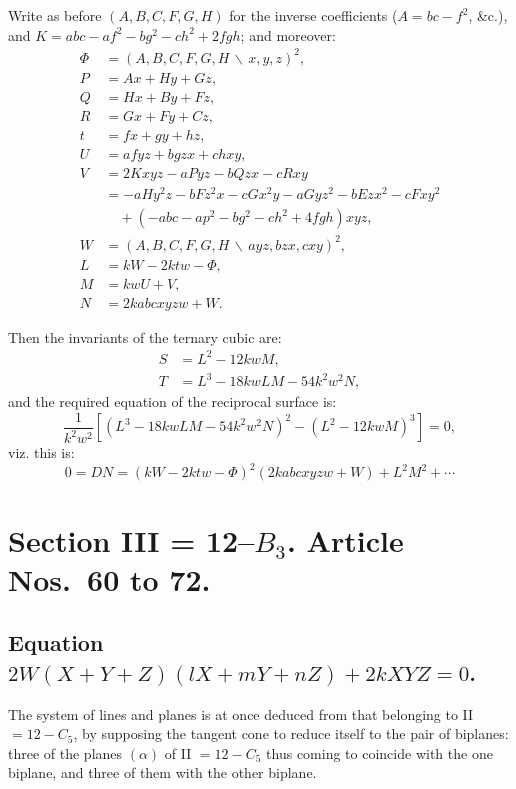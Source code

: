 \documentclass[11pt,a4paper]{article}
\begin{document}
Write as before $(A,B,C,F,G,H)$ for the inverse coefficients ($A = bc - f^2$, \&c.), and $K = abc - af^2 - bg^2 - ch^2 + 2fgh$; and moreover:
\begin{align*}
\Phi &= (A,B,C,F,G,H \,\backslash\, x,y,z)^2, \\
P &= Ax + Hy + Gz, \\
Q &= Hx + By + Fz, \\
R &= Gx + Fy + Cz, \\
t &= fx + gy + hz, \\
U &= afyz + bgzx + chxy, \\
V &= 2Kxyz - aPyz - bQzx - cRxy \\
  &= -aHy^2z - bFz^2x - cGx^2y - aGyz^2 - bEzx^2 - cFxy^2 \\
  &\quad + (-abc - ap^2 - bg^2 - ch^2 + 4fgh)xyz, \\
W &= (A,B,C,F,G,H \,\backslash\, ayz, bzx, cxy)^2, \\
L &= kW - 2ktw - \Phi, \\
M &= kwU + V, \\
N &= 2kabcxyzw + W.
\end{align*}

Then the invariants of the ternary cubic are:
\begin{align*}
S &= L^2 - 12kwM, \\
T &= L^3 - 18kwLM - 54k^2w^2N,
\end{align*}
and the required equation of the reciprocal surface is:
\begin{equation*}
\frac{1}{k^2w^2}\left[(L^3 - 18kwLM - 54k^2w^2N)^2 - (L^2 - 12kwM)^3\right] = 0,
\end{equation*}
viz. this is:
\begin{equation*}
0 = DN = (kW - 2ktw - \Phi)^2(2kabcxyzw + W) + L^2M^2 + \cdots
\end{equation*}

\section*{Section III = 12--$B_3$. \quad Article Nos.~60 to 72.}

\setcounter{section}{60}
\subsection*{Equation $2W(X+Y+Z)(lX+mY+nZ) + 2kXYZ = 0$.}

The system of lines and planes is at once deduced from that belonging to II $= 12 - C_5$, by supposing the tangent cone to reduce itself to the pair of biplanes: three of the planes $(\alpha)$ of II $= 12 - C_5$ thus coming to coincide with the one biplane, and three of them with the other biplane.
\end{document}
